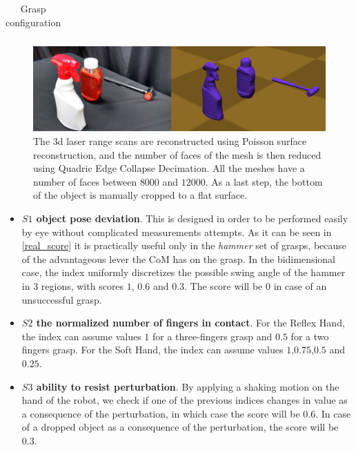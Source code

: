 \begin{table}[hbt]
\begin{center}
\begin{tabular}{| p{1.5cm}  | c | c | p{2.5cm} | c |}
   \end{tabular}
   \end{center}
   \caption{Grasp configuration}
   \label{table:grasp}
\end{table}


\begin{figure}[!hbt]
\begin{center}
        \includegraphics[width=0.95\columnwidth]     {images/ssoch/objects}
        \caption{The 3d laser range scans are reconstructed using Poisson surface reconstruction, and the number of faces of the mesh is then reduced using Quadric Edge Collapse Decimation. All the meshes have a number of faces between $8000$ and $12000$. As a last step, the bottom of the object is manually cropped to a flat surface.}
        \label{meshes}
        \end{center}
\end{figure}




\begin{itemize}
\item \textbf{$S1$ object pose deviation}. This is designed in order to be performed easily by eye without complicated measurements attempts. As it can be seen in \ref{real_score} it is practically useful only in the \emph{hammer} set of grasps, because of the advantageous lever the CoM has on the grasp. In the bidimensional case, the index uniformly discretizes the possible swing angle of the hammer in $3$ regions, with scores $1$, $0.6$ and $0.3$. The score will be $0$ in case of an unsuccessful grasp.
\item \textbf{$S2$ the normalized number of fingers in contact}. For the Reflex Hand, the index can assume values $1$ for a three-fingers grasp and $0.5$ for a two fingers grasp. For the Soft Hand, the index can assume values $1$,$0.75$,$0.5$ and $0.25$.
\item \textbf{$S3$ ability to resist perturbation}. By applying a shaking motion on the hand of the robot, we check if one of the previous indices changes in value as a consequence of the perturbation, in which case the score will be $0.6$. In case of a dropped object as a consequence of the perturbation, the score will be $0.3$.
\end{itemize}



